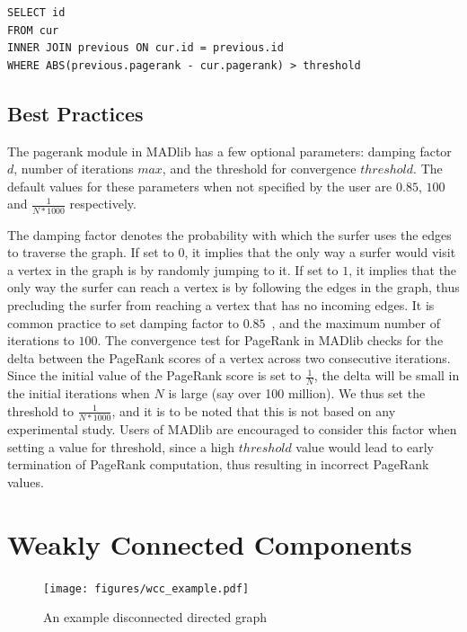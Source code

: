\begin{algorithm}
\label{alg:pagerank:update}
\begin{lstlisting}
SELECT id
FROM cur
INNER JOIN previous ON cur.id = previous.id
WHERE ABS(previous.pagerank - cur.pagerank) > threshold
\end{lstlisting}
\end{algorithm}

\subsection{Best Practices} \label{sec:pagerank:bestpractices}

The pagerank module in MADlib has a few optional parameters: damping factor
$d$, number of iterations $max$, and the threshold for convergence $threshold$.
The default values for these parameters when not specified by the user are
$0.85$, $100$ and $\frac{1}{N*1000}$ respectively.

The damping factor denotes the probability with which the surfer uses the edges
to traverse the graph. If set to $0$, it implies that the only way a surfer
would visit a vertex in the graph is by randomly jumping to it. If set to
$1$, it implies that the only way the surfer can reach a vertex is by following
the edges in the graph, thus precluding the surfer from reaching a vertex
that has no incoming edges. It is common practice to set damping factor
to $0.85$~\cite{pagerank}, and the maximum number of iterations to $100$.
The convergence test for PageRank in MADlib checks for the delta between
the PageRank scores of a vertex across two consecutive iterations. Since
the initial value of the PageRank score is set to $\frac{1}{N}$, the delta
will be small in the initial iterations when $N$ is large (say over 100
million). We thus set the threshold to $\frac{1}{N*1000}$, and it is to be
noted that this is not based on any experimental study. Users of MADlib are
encouraged to consider this factor when setting a value for threshold, since
a high $threshold$ value would lead to early termination of PageRank
computation, thus resulting in incorrect PageRank values.


\section{Weakly Connected Components} \label{sec:graph:wcc}
\begin{figure}[h]
    \centering
    \texttt{[image: figures/wcc\_example.pdf]}
\caption{An example disconnected directed graph}
\label{wcc:example}
\end{figure}

